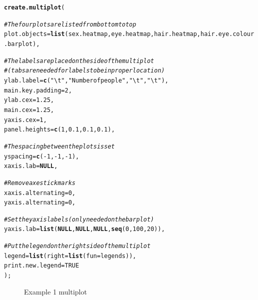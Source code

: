 \documentclass[letterpaper]{article}\usepackage[]{graphicx}\usepackage[]{color}
\makeatletter
\newcommand{\hlnum}[1]{\textcolor[rgb]{0.686,0.059,0.569}{#1}}%
\newcommand{\hlstr}[1]{\textcolor[rgb]{0.192,0.494,0.8}{#1}}%
\newcommand{\hlcom}[1]{\textcolor[rgb]{0.678,0.584,0.686}{\textit{#1}}}%
\newcommand{\hlopt}[1]{\textcolor[rgb]{0,0,0}{#1}}%
\newcommand{\hlstd}[1]{\textcolor[rgb]{0.345,0.345,0.345}{#1}}%
\newcommand{\hlkwa}[1]{\textcolor[rgb]{0.161,0.373,0.58}{\textbf{#1}}}%
\newcommand{\hlkwc}[1]{\textcolor[rgb]{0.333,0.667,0.333}{#1}}%
\newcommand{\hlkwd}[1]{\textcolor[rgb]{0.737,0.353,0.396}{\textbf{#1}}}%
\newenvironment{kframe}{%
 \def\at@end@of@kframe{}%
 \ifinner\ifhmode%
  \def\at@end@of@kframe{\end{minipage}}%
  \begin{minipage}{\columnwidth}%
 \fi\fi%
 \def\FrameCommand##1{\hskip\@totalleftmargin \hskip-\fboxsep
 \colorbox{shadecolor}{##1}\hskip-\fboxsep
     \hskip-\linewidth \hskip-\@totalleftmargin \hskip\columnwidth}%
 \MakeFramed {\advance\hsize-\width
   \@totalleftmargin\z@ \linewidth\hsize
   \@setminipage}}%
 {\par\unskip\endMakeFramed%
 \at@end@of@kframe}
\newenvironment{knitrout}{}{} %
\makeatother
\begin{document}
\begin{knitrout}
\color{fgcolor}\begin{kframe}
\begin{alltt}
 \hlkwd{create.multiplot}\hlstd{(}

         \hlcom{# The four plots are listed from bottom to top }
         \hlkwc{plot.objects} \hlstd{=} \hlkwd{list}\hlstd{(sex.heatmap, eye.heatmap, hair.heatmap, hair.eye.colour.barplot),}

         \hlcom{# The labels are placed on the side of the multiplot }
         \hlcom{# (tabs are needed for labels to be in proper location)}
         \hlkwc{ylab.label} \hlstd{=} \hlkwd{c}\hlstd{(}\hlstr{"\textbackslash{}t"}\hlstd{,} \hlstr{"Number of people"}\hlstd{,} \hlstr{"\textbackslash{}t"}\hlstd{,} \hlstr{"\textbackslash{}t"}\hlstd{),}
         \hlkwc{main.key.padding} \hlstd{=} \hlnum{2}\hlstd{,}
         \hlkwc{ylab.cex} \hlstd{=} \hlnum{1.25}\hlstd{,}
         \hlkwc{main.cex} \hlstd{=} \hlnum{1.25}\hlstd{,}
         \hlkwc{yaxis.cex} \hlstd{=} \hlnum{1}\hlstd{,}
         \hlkwc{panel.heights} \hlstd{=} \hlkwd{c}\hlstd{(}\hlnum{1}\hlstd{,} \hlnum{0.1}\hlstd{,} \hlnum{0.1}\hlstd{,} \hlnum{0.1}\hlstd{),}

         \hlcom{# The spacing between the plots is set}
         \hlkwc{yspacing} \hlstd{=} \hlkwd{c}\hlstd{(}\hlopt{-}\hlnum{1}\hlstd{,} \hlopt{-}\hlnum{1}\hlstd{,} \hlopt{-}\hlnum{1}\hlstd{),}
         \hlkwc{xaxis.lab} \hlstd{=} \hlkwa{NULL}\hlstd{,}

         \hlcom{# Remove axes tick marks}
         \hlkwc{xaxis.alternating} \hlstd{=} \hlnum{0}\hlstd{,}
         \hlkwc{yaxis.alternating} \hlstd{=} \hlnum{0}\hlstd{,}

         \hlcom{# Set the yaxis labels (only needed on the bar plot)}
         \hlkwc{yaxis.lab} \hlstd{=} \hlkwd{list}\hlstd{(}\hlkwa{NULL}\hlstd{,} \hlkwa{NULL}\hlstd{,} \hlkwa{NULL}\hlstd{,} \hlkwd{seq}\hlstd{(}\hlnum{0}\hlstd{,} \hlnum{100}\hlstd{,} \hlnum{20}\hlstd{)),}

         \hlcom{# Put the legend on the right side of the multiplot}
         \hlkwc{legend} \hlstd{=} \hlkwd{list}\hlstd{(}\hlkwc{right} \hlstd{=} \hlkwd{list}\hlstd{(}\hlkwc{fun} \hlstd{= legends)),}
         \hlkwc{print.new.legend} \hlstd{=} \hlnum{TRUE}
         \hlstd{);}
\end{alltt}
\end{kframe}\begin{figure}[]


{\centering {} 

}

\caption[Example 1 multiplot]{Example 1 multiplot\label{fig:multiplotex1_final}}
\end{figure}


\end{knitrout}
\end{document}
